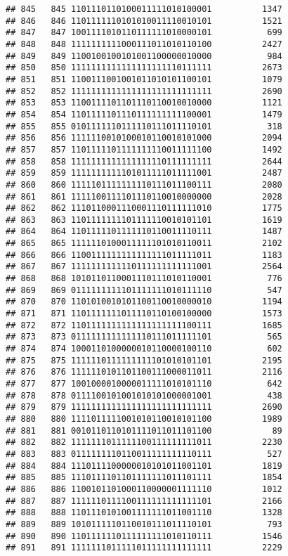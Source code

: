 \documentclass[]{article}
\begin{document}
\begin{verbatim}
## 845   845 1101110110100011111010100001          1347
## 846   846 1101111110101010011110010101          1521
## 847   847 1001111010110111111010000101           699
## 848   848 1111111111000111011010110100          2427
## 849   849 1100100100101001100000010000           984
## 850   850 1111111111111111111110111111          2673
## 851   851 1100111001001011010101100101          1079
## 852   852 1111111111111111111111111111          2690
## 853   853 1100111101101110110010010000          1121
## 854   854 1101111101110111111111100001          1479
## 855   855 0101111110111110111011110101           318
## 856   856 1111110010100010110010101000          2094
## 857   857 1101111101111111110011111100          1492
## 858   858 1111111111111111110111111111          2644
## 859   859 1111111111101011111011111001          2487
## 860   860 1111101111111110111011100111          2080
## 861   861 1111100111101110110010000000          2028
## 862   862 1110110001110001110111111010          1775
## 863   863 1101111111101111110010101101          1619
## 864   864 1101111101111110110011110111          1487
## 865   865 1111110100011111101010110011          2102
## 866   866 1100111111111111111011111011          1183
## 867   867 1111111111110111111111111001          2564
## 868   868 1010110110001110111010110001           776
## 869   869 0111111111101111111010111110           547
## 870   870 1101010010101100110010000010          1194
## 871   871 1101111111011110110100100000          1573
## 872   872 1101111111111111111111100111          1685
## 873   873 0111111111111110111011111101           565
## 874   874 1000110100000010110000100110           602
## 875   875 1111110111111111101010101101          2195
## 876   876 1111110101101100111000011011          2116
## 877   877 1001000010000011111010101110           642
## 878   878 0111100101001010101000001001           438
## 879   879 1111111111111111111111111111          2690
## 880   880 1111011111001010110010101100          1989
## 881   881 0010110110101111011011101100            89
## 882   882 1111111011111100111111111011          2230
## 883   883 0111111110110011111111110111           527
## 884   884 1110111100000010101011001101          1819
## 885   885 1110111101101111111011101111          1854
## 886   886 1100101101000110000001111110          1012
## 887   887 1111110111100111111111111101          2166
## 888   888 1101110101001111111011001110          1328
## 889   889 1010111110110010111011110101           793
## 890   890 1101111110111111111010110111          1546
## 891   891 1111111011111011111111111111          2229

\end{verbatim}
\end{document}
